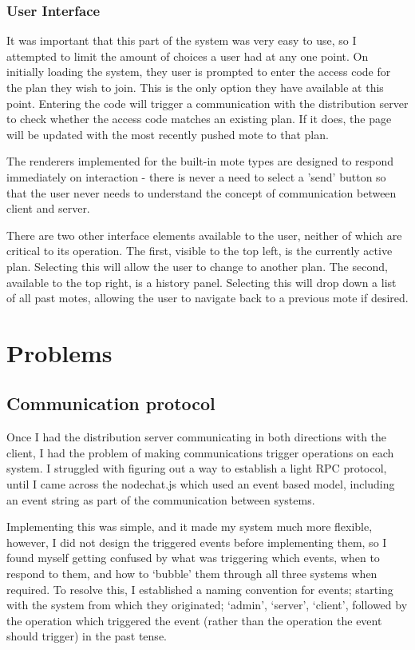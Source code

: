 \documentclass[a4papert,11pt,notitlepage]{ltxdoc}
\begin{document}

\subsubsection{User Interface}
It was important that this part of the system was very easy to use, so I attempted to limit the amount of choices a user had at any one point. On initially loading the system, they user is prompted to enter the access code for the plan they wish to join. This is the only option they have available at this point. Entering the code will trigger a communication with the distribution server to check whether the access code matches an existing plan. If it does, the page will be updated with the most recently pushed mote to that plan.

The renderers implemented for the built-in mote types are designed to respond immediately on interaction - there is never a need to select a 'send' button so that the user never needs to understand the concept of communication between client and server.

There are two other interface elements available to the user, neither of which are critical to its operation. The first, visible to the top left, is the currently active plan. Selecting this will allow the user to change to another plan. The second, available to the top right, is a history panel. Selecting this will drop down a list of all past motes, allowing the user to navigate back to a previous mote if desired.

\section{Problems}
\subsection{Communication protocol}
Once I had the distribution server communicating in both directions with the client, I had the problem of making communications trigger operations on each system. I struggled with figuring out a way to establish a light RPC protocol, until I came across the nodechat.js\cite{nodechatjs:web} which used an event based model, including an event string as part of the communication between systems. 

Implementing this was simple, and it made my system much more flexible, however, I did not design the triggered events before implementing them, so I found myself getting confused by what was triggering which events, when to respond to them, and how to `bubble' them through all three systems when required. To resolve this, I established a naming convention for events; starting with the system from which they originated; `admin', `server', `client', followed by the operation which triggered the event (rather than the operation the event should trigger) in the past tense. 
\end{document}

